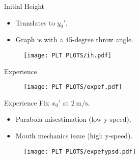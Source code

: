 \documentclass[compress,12pt,mp]{beamer}
\begin{document}
\begin{frame}[t]{Initial Height}
\begin{itemize}
    \item Translates to $y_0'$.   %
    \item Graph is with a 45-degree throw angle.
\end{itemize}
\begin{figure}
  \centering
  \texttt{[image: PLT PLOTS/ih.pdf]}
\end{figure}
\end{frame}
\begin{frame}{Experience}
\begin{figure}
  \centering
  \texttt{[image: PLT PLOTS/expef.pdf]}
\end{figure}
\end{frame}
\begin{frame}[t]{Experience}
    Fix $x_0'$ at $\SI[per-mode=symbol]{2}{\m\per\s}$.
    \begin{itemize}
        \item Parabola misestimation (low y-speed), %
        \item Mouth mechanics issue (high y-speed). %
    \end{itemize}
    \begin{figure}
  \centering
  \texttt{[image: PLT PLOTS/expefypsd.pdf]}
\end{figure}
\end{frame}
\end{document}
